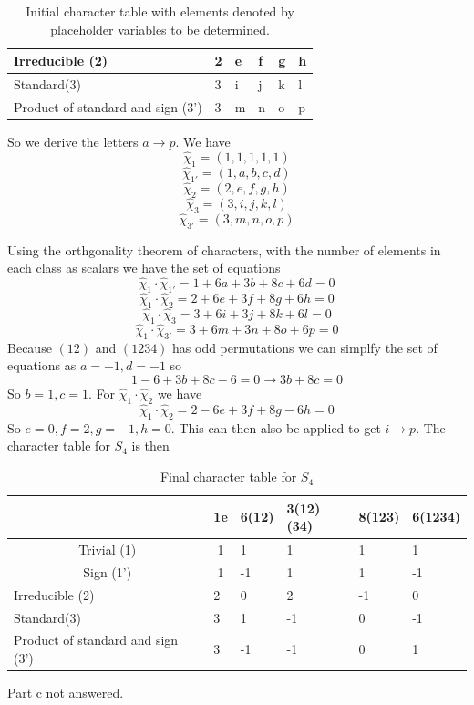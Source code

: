 \documentclass[12pt]{article}
\newcounter{alplisti}
\renewcommand{\thealplisti}{\alph{alplisti}}
\newenvironment{alplist}[1][(\thealplisti)]{\begin{list}{{\rm #1}\ }{ %
      \usecounter{alplisti} %
    \setlength{\itemsep}{0pt}
    \setlength{\parsep}{0pt}  %
     \setlength{\topsep}{0pt} %
}}{\end{list}}
\begin{document}
\begin{alplist}
\begin{table}[h]
\begin{tabular}{l|l|l|l|l|l|}
  \multicolumn{1}{|l|}{Irreducible (2)}                   & 2                       & e     & f         & g      & h       \\ \hline
  \multicolumn{1}{|l|}{Standard(3)}                       & 3                       & i     & j         & k      & l       \\ \hline
  \multicolumn{1}{|l|}{Product of standard and sign (3')} & 3                       & m     & n         & o      & p       \\ \hline
  \end{tabular}
  \caption{Initial character table with elements denoted by placeholder variables to be determined. }
  \label{tab1}
  \end{table}
So we derive the letters $a \rightarrow p$. We have 
$$ \hat{\chi}_1 = (1,1,1,1,1)$$
$$ \hat{\chi}_{1'} = (1,a,b,c,d)$$
$$ \hat{\chi}_2 = (2,e,f,g,h)$$
$$ \hat{\chi}_3 = (3,i,j,k,l)$$
$$ \hat{\chi}_{3'} = (3,m,n,o,p)$$

Using the orthgonality theorem of characters, with the number of elements in each class as scalars we have the set of equations 
$$ \hat{\chi}_1 \cdot \hat{\chi}_{1'} = 1 + 6a+3b +8c +6d =0 $$
$$ \hat{\chi}_1 \cdot \hat{\chi}_{2} = 2 + 6e +3f +8g +6h =0$$
$$ \hat{\chi}_1 \cdot \hat{\chi}_{3} = 3+6i+3j +8k +6l= 0$$
$$ \hat{\chi}_1 \cdot \hat{\chi}_{3'} = 3+6m +3n +8o +6p =0 $$
Because $(12)$ and $(1234)$ has odd permutations we can simplfy the set of equations as $a=-1, d=-1$ so 
$$ 1-6+3b +8c -6 =0 \rightarrow 3b+8c =0$$
So $b=1, c=1$. For $\hat{\chi}_1 \cdot \hat{\chi}_{2}$ we have 
$$ \hat{\chi}_1 \cdot \hat{\chi}_{2} = 2-6e +3f +8g -6h=0 $$
So $e=0, f=2, g=-1, h=0$. This can then also be applied to get $i \rightarrow p$. The character table for $S_4$ is then 
\begin{table}[h]
  \centering
  \begin{tabular}{l|l|l|l|l|l|}
  \cline{2-6}
  \multicolumn{1}{c|}{}                                   & \multicolumn{1}{c|}{1e} & 6(12) & 3(12)(34) & 8(123) & 6(1234) \\ \hline
  \multicolumn{1}{|c|}{Trivial (1)}                       & \multicolumn{1}{c|}{1}  & 1     & 1         & 1      & 1       \\ \hline
  \multicolumn{1}{|c|}{Sign (1')}                         & \multicolumn{1}{c|}{1}  & -1    & 1         & 1      & -1      \\ \hline
  \multicolumn{1}{|l|}{Irreducible (2)}                   & 2                       & 0     & 2         & -1     & 0       \\ \hline
  \multicolumn{1}{|l|}{Standard(3)}                       & 3                       & 1     & -1        & 0      & -1      \\ \hline
  \multicolumn{1}{|l|}{Product of standard and sign (3')} & 3                       & -1    & -1        & 0      & 1       \\ \hline
  \end{tabular}
  \caption{Final character table for $S_4$}
  \label{tab2}
  \end{table}
 \item Part c not answered.
\end{alplist}
\end{document}
